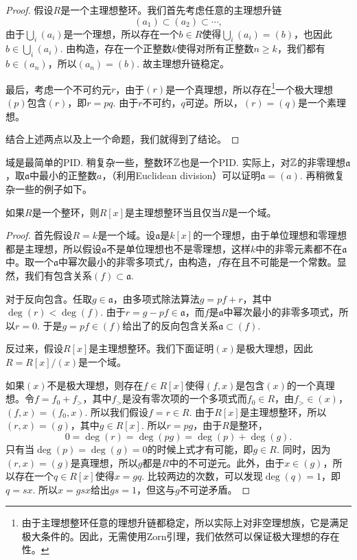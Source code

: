 \begin{proof}
假设$R$是一个主理想整环。我们首先考虑任意的主理想升链
\[
	(a_1)\subset (a_2)\subset \cdots,
\]
由于$\bigcup_i (a_i)$是一个理想，所以存在一个$b\in R$使得$\bigcup_i (a_i)=(b)$，也因此$b\in \bigcup_i (a_i)$. 由构造，存在一个正整数$k$使得对所有正整数$n\geq k$，我们都有$b\in (a_n)$，所以$(a_n)=(b)$. 故主理想升链稳定。

最后，考虑一个不可约元$r$，由于$(r)$是一个真理想，所以存在\footnote{由于主理想整环任意的理想升链都稳定，所以实际上对非空理想族，它是满足极大条件的。因此，无需使用Zorn引理，我们依然可以保证极大理想的存在性。}一个极大理想$(p)$包含$(r)$，即$r=pq$. 由于$r$不可约，$q$可逆。所以，$(r)=(q)$是一个素理想。 

结合上述两点以及上一个命题，我们就得到了结论。
\end{proof}

域是最简单的PID. 稍复杂一些，整数环$\mathbb{Z}$也是一个PID. 实际上，对$\mathbb{Z}$的非零理想$\mathfrak{a}$，取$\mathfrak{a}$中最小的正整数$a$，（利用Euclidean division）可以证明$\mathfrak{a}=(a)$. 再稍微复杂一些的例子如下。

\begin{pro}
如果$R$是一个整环，则$R[x]$是主理想整环当且仅当$R$是一个域。
\end{pro}

\begin{proof}
	首先假设$R=k$是一个域。设$\mathfrak{a}$是$k[x]$的一个理想，由于单位理想和零理想都是主理想，所以假设$\mathfrak{a}$不是单位理想也不是零理想，这样$k$中的非零元素都不在$\mathfrak{a}$中。取一个$\mathfrak{a}$中幂次最小的非零多项式$f$，由构造，$f$存在且不可能是一个常数。显然，我们有包含关系$(f)\subset \mathfrak{a}$.

	对于反向包含。任取$g\in \mathfrak{a}$，由多项式除法算法$g=pf+r$，其中$\deg(r)<\deg(f)$. 由于$r=g-pf\in \mathfrak{a}$，而$f$是$\mathfrak{a}$中幂次最小的非零多项式，所以$r=0$. 于是$g=pf\in (f)$给出了的反向包含关系$\mathfrak{a}\subset (f)$. 

	反过来，假设$R[x]$是主理想整环。我们下面证明$(x)$是极大理想，因此$R=R[x]/(x)$是一个域。

	如果$(x)$不是极大理想，则存在$f\in R[x]$使得$(f,x)$是包含$(x)$的一个真理想。令$f=f_0+f_>$，其中$f_>$是没有零次项的一个多项式而$f_0\in R$，由$f_>\in(x)$，$(f,x)=(f_0,x)$. 所以我们假设$f=r\in R$. 由于$R[x]$是主理想整环，所以$(r,x)=(g)$，其中$g\in R[x]$. 所以$r=pg$，由于$R$是整环，
	\[
		0=\deg(r)=\deg(pg)=\deg(p)+\deg(g). 
	\]
	只有当$\deg(p)=\deg(g)=0$的时候上式才有可能，即$g\in R$. 同时，因为$(r,x)=(g)$是真理想，所以$g$都是$R$中的不可逆元。此外，由于$x\in (g)$，所以存在一个$q\in R[x]$使得$x=gq$. 比较两边的次数，可以发现$\deg(q)=1$，即$q=sx$. 所以$x=gsx$给出$gs=1$，但这与$g$不可逆矛盾。
\end{proof}

